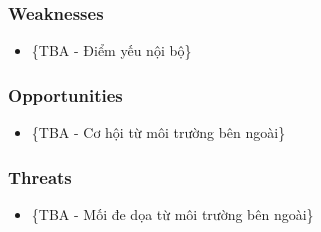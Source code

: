 \subsubsection{Weaknesses}
\begin{itemize}
    \item \{TBA - Điểm yếu nội bộ\}
\end{itemize}

\subsubsection{Opportunities}
\begin{itemize}
    \item \{TBA - Cơ hội từ môi trường bên ngoài\}
\end{itemize}

\subsubsection{Threats}
\begin{itemize}
    \item \{TBA - Mối đe dọa từ môi trường bên ngoài\}
\end{itemize}